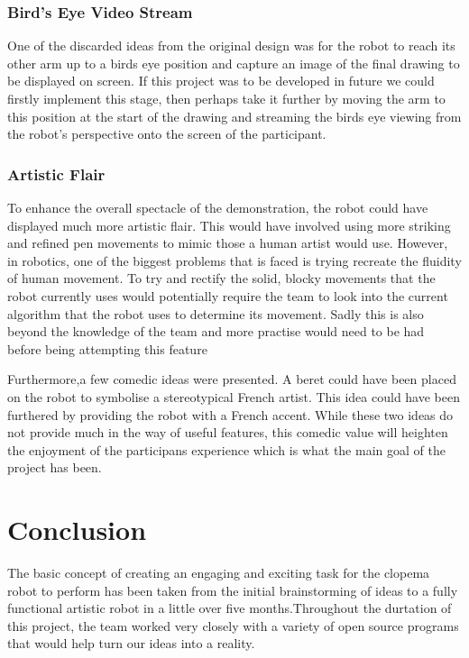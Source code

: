 \documentclass{l3proj}
\begin{document}
\subsection{Bird's Eye Video Stream}
One of the discarded ideas from the original design was for the robot to reach its other arm up to a birds eye position and capture an image of the final drawing to be displayed on screen. If this project was to be developed in future we could firstly implement this stage, then perhaps take it further by moving the arm to this position at the start of the drawing and streaming the birds eye viewing from the robot's perspective onto the screen of the participant.

\subsection{Artistic Flair}
To enhance the overall spectacle of the demonstration, the robot could have displayed much more artistic flair. This would have involved using more striking and refined pen movements to mimic those a human artist would use. However, in robotics, one of the biggest problems that is faced is trying recreate the fluidity of human movement. To try and rectify the solid, blocky movements that the robot currently uses would potentially require the team to look into the current algorithm that the robot uses to determine its movement. Sadly this is also beyond the knowledge of the team and more practise would need to be had before being attempting this feature

Furthermore,a few comedic ideas were presented. A beret could have been placed on the robot to symbolise a stereotypical French artist. This idea could have been furthered by providing the robot with a French accent. While these two ideas do not provide much in the way of useful features, this comedic value will heighten the enjoyment of the participans experience which is what the main goal of the project has been.



%  
\chapter{Conclusion}
The basic concept of creating an engaging and exciting task for the \acrshort{clopema} robot to perform has been taken from the initial brainstorming of ideas to a fully functional artistic robot in a little over five months.Throughout the durtation of this project, the team worked very closely with a variety of open source programs that would help turn our ideas into a reality. 
\end{document}
